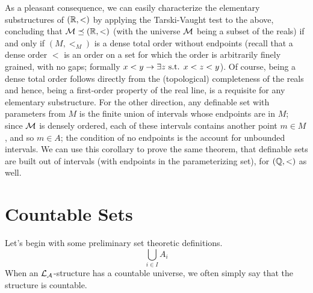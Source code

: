 \documentclass{article}
\begin{document}
As a pleasant consequence, we can easily characterize the elementary substructures of $ (\mathbb{R}, <) $ by applying the Tarski-Vaught test to the above, concluding that $ \mathcal{M} \preceq (\mathbb{R}, <) $ (with the universe $ \mathcal{M} $ being a subset of the reals) if and only if $ (M, <_M) $ is a dense total order without endpoints (recall that a dense order $ < $ is an order on a set for which the order is arbitrarily finely grained, with no gaps; formally $ x < y \rightarrow \exists z \textnormal{ s.t. } x < z < y $). Of course, being a dense total order follows directly from the (topological) completeness of the reals and hence, being a first-order property of the real line, is a requisite for any elementary substructure. For the other direction, any definable set with parameters from $ M $ is the finite union of intervals whose endpoints are in $ M $; since $ \mathcal{M} $ is densely ordered, each of these intervals contains another point $ m \in M $, and so $ m \in A $; the condition of no endpoints is the account for unbounded intervals. We can use this corollary to prove the same theorem, that definable sets are built out of intervals (with endpoints in the parameterizing set), for $ (\mathbb{Q}, <) $ as well.

\section{Countable Sets}
Let's begin with some preliminary set theoretic definitions.
    $$ \bigcup_{i \in I} A_i $$
When an $ \mathcal{L}_{\mathcal{A}} $-structure has a countable universe, we often simply say that the structure is countable.
\end{document}
